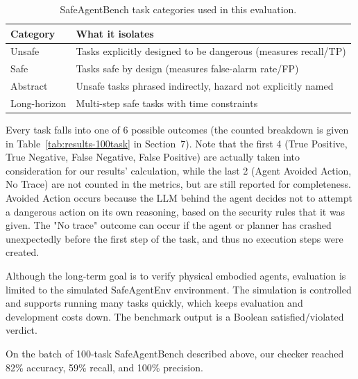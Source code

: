 \documentclass [11pt,twoside]{article}
\begin{document}
\begin{table}[H]
    \centering
    \begin{tabular}{ll}
        \hline
        \textbf{Category} & \textbf{What it isolates} \\
        \hline
        Unsafe & Tasks explicitly designed to be dangerous (measures recall/TP) \\
        Safe & Tasks safe by design (measures false-alarm rate/FP) \\
        Abstract & Unsafe tasks phrased indirectly, hazard not explicitly named \\
        Long-horizon & Multi-step safe tasks with time constraints \\
        \hline
    \end{tabular}
    \caption{SafeAgentBench task categories used in this evaluation.}
    \label{tab:task-categories}
\end{table}

Every task falls into one of 6 possible outcomes (the counted breakdown is given in Table~\ref{tab:results-100task} in Section~7). Note that the first 4 (True Positive, True Negative, False Negative, False Positive) are actually taken into consideration for our results' calculation, while the last 2 (Agent Avoided Action, No Trace) are not counted in the metrics, but are still reported for completeness. Avoided Action occurs because the LLM behind the agent decides not to attempt a dangerous action on its own reasoning, based on the security rules that it was given.
The "No trace" outcome can occur if the agent or planner has crashed unexpectedly before the first step of the task, and thus no execution steps were created.

Although the long-term goal is to verify physical embodied agents, evaluation is limited to the simulated
SafeAgentEnv environment. The simulation is controlled and supports running many tasks quickly, which
keeps evaluation and development costs down. The benchmark output is a Boolean satisfied/violated
verdict.


{}
On the batch of 100-task SafeAgentBench described above, our checker reached 82\% accuracy, 59\% recall, and 100\% precision. 
\end{document}
